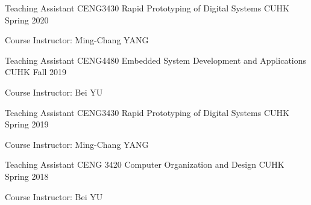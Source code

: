 


\begin{cventries}


\cventry
{Teaching Assistant} %
{CENG3430 Rapid Prototyping of Digital Systems} %
{CUHK} %
{Spring 2020} %
{ %
\begin{cvitems}
\item {Course Instructor: Ming-Chang YANG}
\end{cvitems}
}

\cventry
{Teaching Assistant} %
{CENG4480 Embedded System Development and Applications} %
{CUHK} %
{Fall 2019} %
{ %
\begin{cvitems}
\item {Course Instructor: Bei YU}
\end{cvitems}
}

\cventry
{Teaching Assistant} %
{CENG3430 Rapid Prototyping of Digital Systems} %
{CUHK} %
{Spring 2019} %
{ %
\begin{cvitems}
\item {Course Instructor: Ming-Chang YANG}
\end{cvitems}
}

\cventry
{Teaching Assistant} %
{CENG 3420 Computer Organization and Design} %
{CUHK} %
{Spring 2018} %
{ %
\begin{cvitems}
\item {Course Instructor: Bei YU}
\end{cvitems}
}


\end{cventries}